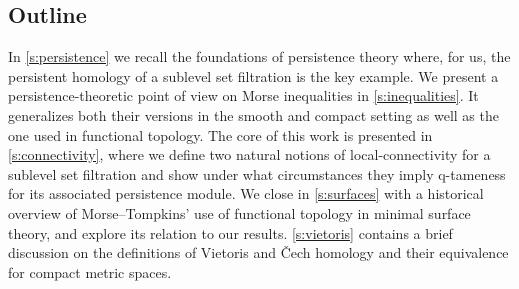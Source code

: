 \subsection*{Outline}

In \cref{s:persistence} we recall the foundations of persistence theory where, for us, the persistent homology of a sublevel set filtration is the key example.
We present a persistence-theoretic point of view on Morse inequalities in \cref{s:inequalities}.
It generalizes both their versions in the smooth and compact setting as well as the one used in functional topology.
The core of this work is presented in \cref{s:connectivity}, where we define two natural notions of local-connectivity for a sublevel set filtration and show under what circumstances they imply q-tameness for its associated persistence module.
We close in \cref{s:surfaces} with a historical overview of Morse--Tompkins' use of functional topology in minimal surface theory, and explore its relation to our results.
\cref{s:vietoris} contains a brief discussion on the definitions of Vietoris and \v{C}ech homology and their equivalence for compact metric spaces.
